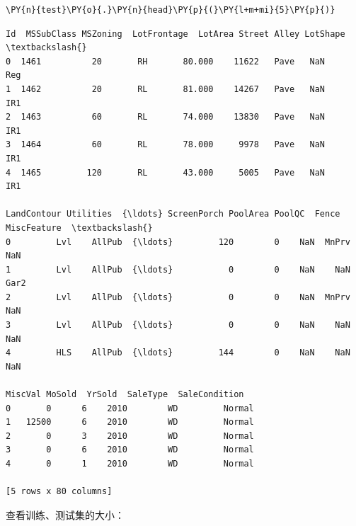 \documentclass[no-math]{YangThesis}
\begin{document}
\begin{tcolorbox}[breakable, size=fbox, boxrule=1pt, pad at break*=1mm,colback=cellbackground, colframe=cellborder]
	\begin{Verbatim}[commandchars=\\\{\}]
\PY{n}{test}\PY{o}{.}\PY{n}{head}\PY{p}{(}\PY{l+m+mi}{5}\PY{p}{)}
	\end{Verbatim}
\end{tcolorbox}

\begin{tcolorbox}[breakable, size=fbox, boxrule=.5pt, pad at break*=1mm, opacityfill=0]
	\begin{Verbatim}[commandchars=\\\{\}]
Id  MSSubClass MSZoning  LotFrontage  LotArea Street Alley LotShape  \textbackslash{}
0  1461          20       RH       80.000    11622   Pave   NaN      Reg
1  1462          20       RL       81.000    14267   Pave   NaN      IR1
2  1463          60       RL       74.000    13830   Pave   NaN      IR1
3  1464          60       RL       78.000     9978   Pave   NaN      IR1
4  1465         120       RL       43.000     5005   Pave   NaN      IR1

LandContour Utilities  {\ldots} ScreenPorch PoolArea PoolQC  Fence MiscFeature  \textbackslash{}
0         Lvl    AllPub  {\ldots}         120        0    NaN  MnPrv         NaN
1         Lvl    AllPub  {\ldots}           0        0    NaN    NaN        Gar2
2         Lvl    AllPub  {\ldots}           0        0    NaN  MnPrv         NaN
3         Lvl    AllPub  {\ldots}           0        0    NaN    NaN         NaN
4         HLS    AllPub  {\ldots}         144        0    NaN    NaN         NaN

MiscVal MoSold  YrSold  SaleType  SaleCondition
0       0      6    2010        WD         Normal
1   12500      6    2010        WD         Normal
2       0      3    2010        WD         Normal
3       0      6    2010        WD         Normal
4       0      1    2010        WD         Normal

[5 rows x 80 columns]
	\end{Verbatim}
\end{tcolorbox}

查看训练、测试集的大小：
\end{document}
